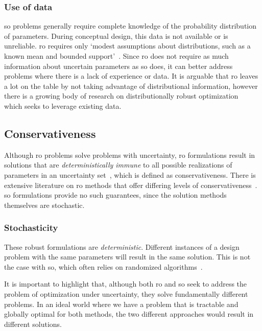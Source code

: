 \subsubsection{Use of data}

\gls{so} problems generally require complete knowledge of the probability distribution of
parameters. During conceptual design, this data is not available or is unreliable.
\gls{ro} requires only `modest assumptions  about distributions, such as a known mean and
bounded support'~\cite{Chen2007}. Since \gls{ro} does not require as much information
about uncertain parameters as \gls{so} does, it can better address problems where there
is a lack of experience or data. It is arguable that \gls{ro}
leaves a lot on the table by not taking advantage of distributional information,
however there is a growing body of research on distributionally robust optimization~\cite{Bertsimas2017}
which seeks to leverage existing data.

\subsection{Conservativeness}

Although \gls{ro} problems solve problems with uncertainty,
\gls{ro} formulations result in solutions that are \emph{deterministically immune}
to all possible realizations of parameters in an uncertainty set~\cite{Bertsimas2011},
which is defined as conservativeness. There is extensive literature on \gls{ro} methods
that offer differing levels of conservativeness~\cite{Bertsimas2004}. \gls{so} formulations
provide no such guarantees, since the solution methods themselves are stochastic.


\subsubsection{Stochasticity}

These robust formulations are \emph{deterministic}. Different instances of a design problem with
the same parameters will result in the same solution. This is not the case with \gls{so},
which often relies on randomized algorithms~\cite{Shmoys2004}.

It is important to highlight that,
although both \gls{ro} and \gls{so} seek to address the problem
of optimization under uncertainty, they solve fundamentally different problems. In an ideal world where
we have a problem that is tractable and globally optimal for both methods, the two different
approaches would result in different solutions.

